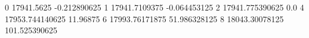0 17941.5625 -0.212890625
1 17941.7109375 -0.064453125
2 17941.775390625 0.0
4 17953.744140625 11.96875
6 17993.76171875 51.986328125
8 18043.30078125 101.525390625
